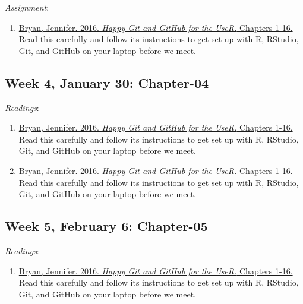 \documentclass[]{article}
\providecommand{\tightlist}{%
  \setlength{\itemsep}{0pt}\setlength{\parskip}{0pt}}
\begin{document}
\emph{Assignment}:

\begin{enumerate}
\def\labelenumi{\arabic{enumi}.}
\tightlist
\item
  \href{http://happygitwithr.com}{Bryan, Jennifer. 2016.
  \textit{Happy Git and GitHub for the UseR.} Chapters 1-16.} Read this
  carefully and follow its instructions to get set up with \textsf{R},
  RStudio, Git, and GitHub on your laptop before we meet.
\end{enumerate}

\hypertarget{week-4-january-30-chapter-04}{%
\subsection{Week 4, January 30:
Chapter-04}\label{week-4-january-30-chapter-04}}

\emph{Readings}:

\begin{enumerate}
\def\labelenumi{\arabic{enumi}.}
\tightlist
\item
  \href{http://happygitwithr.com}{Bryan, Jennifer. 2016.
  \textit{Happy Git and GitHub for the UseR.} Chapters 1-16.} Read this
  carefully and follow its instructions to get set up with \textsf{R},
  RStudio, Git, and GitHub on your laptop before we meet.
\item
  \href{http://happygitwithr.com}{Bryan, Jennifer. 2016.
  \textit{Happy Git and GitHub for the UseR.} Chapters 1-16.} Read this
  carefully and follow its instructions to get set up with \textsf{R},
  RStudio, Git, and GitHub on your laptop before we meet.
\end{enumerate}

\hypertarget{week-5-february-6-chapter-05}{%
\subsection{Week 5, February 6:
Chapter-05}\label{week-5-february-6-chapter-05}}

\emph{Readings}:

\begin{enumerate}
\def\labelenumi{\arabic{enumi}.}
\tightlist
\item
  \href{http://happygitwithr.com}{Bryan, Jennifer. 2016.
  \textit{Happy Git and GitHub for the UseR.} Chapters 1-16.} Read this
  carefully and follow its instructions to get set up with \textsf{R},
  RStudio, Git, and GitHub on your laptop before we meet.
\end{enumerate}
\end{document}
